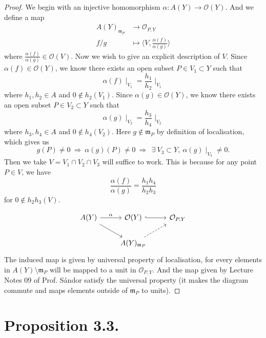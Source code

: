 \begin{proof}
We begin with an injective homomorphism $\alpha:A(Y)\to \mathcal O(Y)$.
And we define a map 
\begin{align*}
    A(Y)_{\mathfrak m_P} &\to \mathcal O_{P,Y}\\
    f/g &\mapsto \langle V,\frac{\alpha(f)}{\alpha(g)}\rangle
\end{align*}where $\frac{\alpha(f)}{\alpha(g)}\in\mathcal O(V)$. 
Now we wish to give an explicit description of $V$.
Since $\alpha(f)\in\mathcal O(Y)$, we know there exists an open subset $P\in V_1\subset Y$ such that 
\[\alpha(f)\mid_{V_1}=\frac{h_1}{h_2}\mid_{V_1}\] where $h_1,h_2\in A$ and $0\notin h_2(V_1)$.
Since $\alpha(g)\in\mathcal O(Y)$, we know there exists an open subset $P\in V_2\subset Y$ such that 
\[\alpha(g)\mid_{V_2}=\frac{h_3}{h_4}\mid_{V_2}\] where $h_3,h_4\in A$ and $0\notin h_4(V_2)$.
Here $g\notin \mathfrak m_P$ by definition of localisation, which gives us 
\[g(P)\neq 0 ~\Rightarrow~ \alpha(g)(P)\neq 0 ~\Rightarrow~ ~\exists~ V_3\subset Y,~ \alpha(g)\mid_{V_3}\neq 0.\] 
Then we take $V=V_1\cap V_2\cap V_3$ will suffice to work. This is because for any point $P\in V$, we have 
\[\frac{\alpha(f)}{\alpha(g)}=\frac{h_1h_4}{h_2h_3}\] for $0\notin h_2h_3(V)$.

\[\begin{tikzcd}
	{A(Y)} & {\mathcal O(Y)} & {\mathcal O_{P, Y}} \\
	& {A(Y)_{\mathfrak m_P}}
	\arrow["\alpha", from=1-1, to=1-2]
	\arrow[hook, from=1-2, to=1-3]
	\arrow[from=1-1, to=2-2]
	\arrow[dashed, from=2-2, to=1-3]
\end{tikzcd}\]
The induced map is given by universal property of localisation, for every elements in $A(Y)\setminus \mathfrak m_{P}$ will be mapped to a unit in $\mathcal O_{P,Y}$. 
And the map given by Lecture Notes 09 of Prof. S\'andor satisfy the universal property (it makes the diagram commute and maps elements outside of $\mathfrak m_P$ to units).

\end{proof}

\section{Proposition 3.3.}

